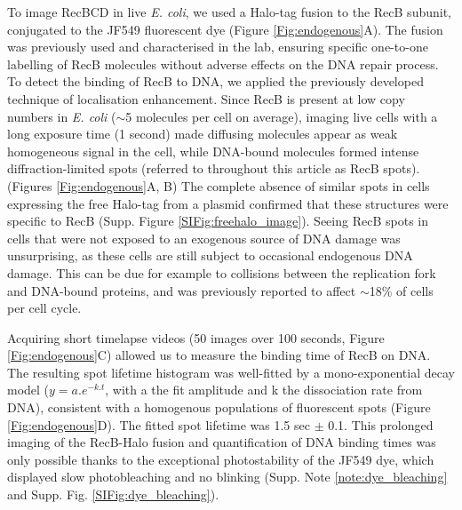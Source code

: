 To image Rec\-BCD in live \textit{E. coli}, we used a Halo-tag fusion to the RecB subunit, conjugated to the JF549 fluorescent dye (Figure \ref{Fig:endogenous}A). The fusion was previously used and characterised in the lab, ensuring specific one-to-one labelling of RecB molecules without adverse effects on the DNA repair process.\cite{Lepore2019a} To detect the binding of RecB to DNA, we applied the previously developed technique of localisation enhancement.\cite{Yu2006, Elf2007}  Since RecB is present at low copy numbers in \textit{E. coli} ($\sim$5 molecules per cell on average\cite{Lepore2019a}), imaging live cells with a long exposure time (1 second) made diffusing molecules appear as weak homogeneous signal in the cell, while DNA-bound molecules formed intense diffraction-limited spots (referred to throughout this article as RecB spots). (Figures \ref{Fig:endogenous}A, B) The complete absence of similar spots in cells expressing the free Halo-tag from a plasmid confirmed that these structures were specific to RecB (Supp. Figure \ref{SIFig:freehalo_image}). Seeing RecB spots in cells that were not exposed to an exogenous source of DNA damage was unsurprising, as these cells are still subject to occasional endogenous DNA damage. This can be due for example to collisions between the replication fork and DNA-bound proteins, and was previously reported to affect $\sim$18\% of cells per cell cycle.\cite{Sinha2018}

Acquiring short timelapse videos (50 images over 100 seconds, Figure \ref{Fig:endogenous}C) allowed us to measure the binding time of RecB on DNA. The resulting spot lifetime histogram was well-fitted by a mono-exponential decay model ($y=a.e^{-k.t}$, with a the fit amplitude and k the dissociation rate from DNA), consistent with a homogenous populations of fluorescent spots (Figure \ref{Fig:endogenous}D). The fitted spot lifetime was 1.5 sec $\pm$ 0.1. This prolonged imaging of the RecB-Halo fusion and quantification of DNA binding times was only possible thanks to the exceptional photostability of the JF549 dye, which displayed slow photobleaching and no blinking (Supp. Note \ref{note:dye_bleaching} and Supp. Fig. \ref{SIFig:dye_bleaching}). 

